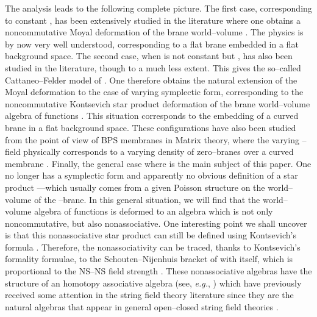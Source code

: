 \documentclass[a4paper,11pt]{article}
\begin{document}
The analysis leads to the following complete picture. The first case,
corresponding to constant \myHighlight{$\omega$}\coordHE{}, has been extensively studied in the
literature where one obtains a noncommutative Moyal deformation of the
brane world--volume \cite{Schomerus, Cornalba-Schiappa, Seiberg-Witten,
Cornalba-2}. The physics is by now very well understood, corresponding to a
flat brane embedded in a flat background space. The second case, when
\myHighlight{$\omega$}\coordHE{} is not constant but \coordHE{}, has also been studied in the
literature, though to a much less extent. This gives the so--called
Cattaneo--Felder model of \cite{Cattaneo-Felder}. One therefore obtains the
natural extension of the Moyal deformation to the case of varying
symplectic form, corresponding to the noncommutative Kontsevich star
product deformation of the brane world--volume algebra of functions
\cite{Kontsevich}. This situation corresponds to the embedding of a curved
brane in a flat background space. These configurations have also been
studied from the point of view of BPS membranes in Matrix theory, where the
varying \coordHE{}--field physically corresponds to a varying density of
zero--branes over a curved membrane \cite{Cornalba-Taylor, Cornalba-1}.
Finally, the general case where \coordHE{} is the main subject of
this paper. One no longer has a symplectic form and apparently no obvious
definition of a star product ---which usually comes from a given Poisson
structure on the world--volume of the \coordHE{}--brane.  In this general
situation, we will find that the world--volume algebra of functions is
deformed to an algebra which is not only noncommutative, but also
nonassociative. One interesting point we shall uncover is that this
nonassociative star product can still be defined using Kontsevich's formula
\cite{Kontsevich}. Therefore, the nonassociativity can be traced, thanks to
Kontsevich's formality formulae, to the Schouten--Nijenhuis bracket of
\coordHE{} with itself, which is proportional to the NS--NS
field strength \coordHE{} \cite{Kontsevich, Cattaneo-Felder}. These
nonassociative algebras have the structure of an \coordHE{} homotopy 
associative algebra (see, \textit{e.g.}, \cite{Stasheff, Lada-Stasheff, 
Lada-Markl}) which have previously received some attention in the string 
field theory literature since they are the natural algebras that appear in 
general open--closed string field theories \cite{Zwiebach,GAB}.
\end{document}
